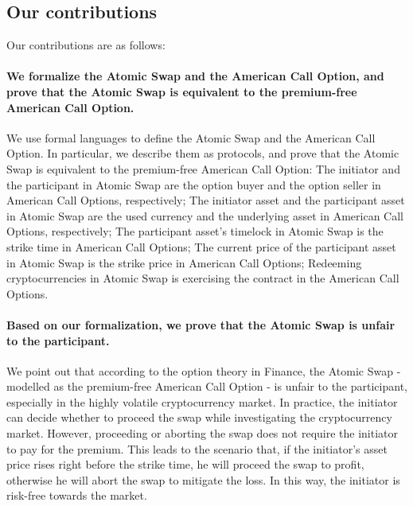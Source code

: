 \subsection{Our contributions}

Our contributions are as follows:

\paragraph{We formalize the Atomic Swap and the American Call Option, and prove that the Atomic Swap is equivalent to the premium-free American Call Option.}
We use formal languages to define the Atomic Swap and the American Call Option.
In particular, we describe them as protocols, and prove that the Atomic Swap is equivalent to the premium-free American Call Option:
The initiator and the participant in Atomic Swap are the option buyer and the option seller in American Call Options, respectively;
The initiator asset and the participant asset in Atomic Swap are the used currency and the underlying asset in American Call Options, respectively;
The participant asset's timelock in Atomic Swap is the strike time in American Call Options;
The current price of the participant asset in Atomic Swap is the strike price in American Call Options;
Redeeming cryptocurrencies in Atomic Swap is exercising the contract in the American Call Options.

\paragraph{Based on our formalization, we prove that the Atomic Swap is unfair to the participant.}
We point out that\TODO{,} according to the option theory in Finance, the Atomic Swap - modelled as the premium-free American Call Option - is unfair to the participant, especially in the highly volatile cryptocurrency market.
In practice, the initiator can decide whether to proceed the swap while investigating the cryptocurrency market.
However, proceeding or aborting the swap does not require the initiator to pay for the premium.
This leads to the scenario that, if the initiator's asset price rises right before the strike time, he will proceed the swap to profit, otherwise he will abort the swap to mitigate  the loss.
In this way, the initiator is risk-free towards the market.

